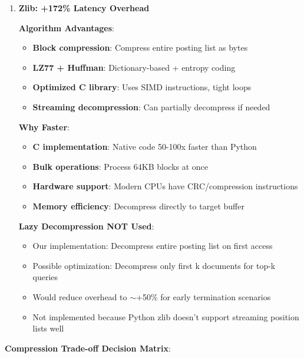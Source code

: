 \documentclass[12pt,a4paper]{article}
\begin{document}
\begin{enumerate}
    \item \textbf{Zlib: +172\% Latency Overhead}
    
    \textbf{Algorithm Advantages}:
    \begin{itemize}
        \item \textbf{Block compression}: Compress entire posting list as bytes
        \item \textbf{LZ77 + Huffman}: Dictionary-based + entropy coding
        \item \textbf{Optimized C library}: Uses SIMD instructions, tight loops
        \item \textbf{Streaming decompression}: Can partially decompress if needed
    \end{itemize}
    
    \textbf{Why Faster}:
    \begin{itemize}
        \item \textbf{C implementation}: Native code 50-100x faster than Python
        \item \textbf{Bulk operations}: Process 64KB blocks at once
        \item \textbf{Hardware support}: Modern CPUs have CRC/compression instructions
        \item \textbf{Memory efficiency}: Decompress directly to target buffer
    \end{itemize}
    
    \textbf{Lazy Decompression NOT Used}:
    \begin{itemize}
        \item Our implementation: Decompress entire posting list on first access
        \item Possible optimization: Decompress only first k documents for top-k queries
        \item Would reduce overhead to $\sim$+50\% for early termination scenarios
        \item Not implemented because Python zlib doesn't support streaming position lists well
    \end{itemize}
\end{enumerate}

\textbf{Compression Trade-off Decision Matrix}:
\end{document}
